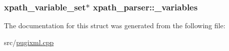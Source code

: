 \label{structxpath__parser_a9370fb875bfc49ca6e35f3165ecb1692}
\hypertarget{structxpath__parser_a3e0adfea7cc81c08b97ee1375831df6c}{
\subsubsection[{\_\-variables}]{\setlength{\rightskip}{0pt plus 5cm}xpath\_\-variable\_\-set$\ast$ {\bf xpath\_\-parser::\_\-variables}}}
\label{structxpath__parser_a3e0adfea7cc81c08b97ee1375831df6c}


The documentation for this struct was generated from the following file:\begin{DoxyCompactItemize}
\item 
src/\hyperlink{pugixml_8cpp}{pugixml.cpp}\end{DoxyCompactItemize}
